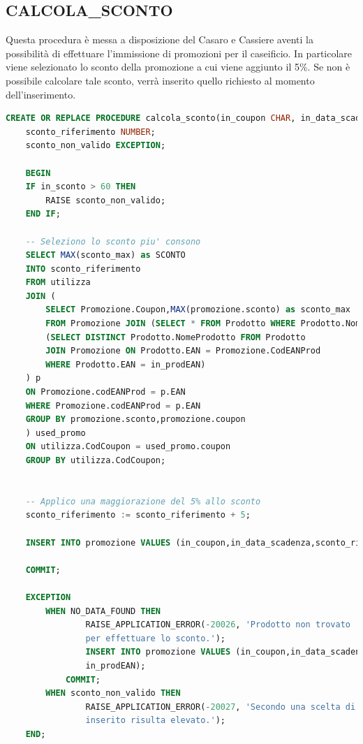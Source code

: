 \documentclass[12pt]{report}
\begin{document}
\subsection*{CALCOLA\_SCONTO}
Questa procedura è messa a disposizione del Casaro e Cassiere aventi la possibilità di effettuare l'immissione di promozioni per il caseificio. In particolare viene selezionato lo sconto della promozione a cui viene aggiunto il 5\%. Se non è possibile calcolare tale sconto, verrà inserito quello richiesto al momento dell'inserimento. 
\begin{lstlisting}[language=SQL,caption={CALCOLO\_SCONTO}]
    CREATE OR REPLACE PROCEDURE calcola_sconto(in_coupon CHAR, in_data_scadenza DATE, in_sconto NUMBER, in_prodEAN CHAR) IS
    sconto_riferimento NUMBER;
    sconto_non_valido EXCEPTION;
    
    BEGIN
    IF in_sconto > 60 THEN
        RAISE sconto_non_valido;
    END IF;
	
    -- Seleziono lo sconto piu' consono
    SELECT MAX(sconto_max) as SCONTO
    INTO sconto_riferimento
    FROM utilizza 
    JOIN (
        SELECT Promozione.Coupon,MAX(promozione.sconto) as sconto_max
		FROM Promozione JOIN (SELECT * FROM Prodotto WHERE Prodotto.NomeProdotto = 
		(SELECT DISTINCT Prodotto.NomeProdotto FROM Prodotto
		JOIN Promozione ON Prodotto.EAN = Promozione.CodEANProd
		WHERE Prodotto.EAN = in_prodEAN)
	) p
	ON Promozione.codEANProd = p.EAN
	WHERE Promozione.codEANProd = p.EAN
	GROUP BY promozione.sconto,promozione.coupon
	) used_promo
    ON utilizza.CodCoupon = used_promo.coupon
    GROUP BY utilizza.CodCoupon;
	
    
    -- Applico una maggiorazione del 5% allo sconto 
    sconto_riferimento := sconto_riferimento + 5;
    
    INSERT INTO promozione VALUES (in_coupon,in_data_scadenza,sconto_riferimento,in_prodEAN);
    
    COMMIT;
    
    EXCEPTION
        WHEN NO_DATA_FOUND THEN
                RAISE_APPLICATION_ERROR(-20026, 'Prodotto non trovato 
                per effettuare lo sconto.');
                INSERT INTO promozione VALUES (in_coupon,in_data_scadenza,in_sconto,
                in_prodEAN);
            COMMIT;
		WHEN sconto_non_valido THEN
                RAISE_APPLICATION_ERROR(-20027, 'Secondo una scelta di mercato, lo sconto 
                inserito risulta elevato.');
    END;
\end{lstlisting}
\end{document}
